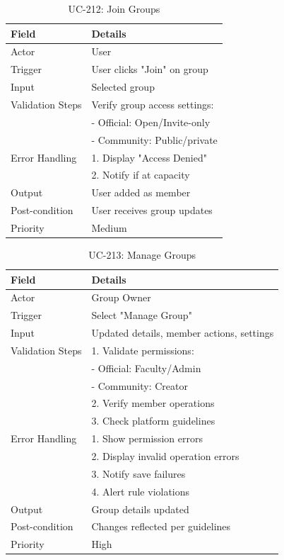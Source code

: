 \begin{table}[H]
\centering
\caption{UC-212: Join Groups}
\begin{tabular}{|l|p{10cm}|}
\hline
\textbf{Field} & \textbf{Details} \\ \hline
Actor & User \\ \hline
Trigger & User clicks "Join" on group \\ \hline
Input & Selected group \\ \hline
Validation Steps & Verify group access settings: \\ 
                 & - Official: Open/Invite-only \\ 
                 & - Community: Public/private \\ \hline
Error Handling & 1. Display "Access Denied" \\ 
               & 2. Notify if at capacity \\ \hline
Output & User added as member \\ \hline
Post-condition & User receives group updates \\ \hline
Priority & Medium \\ \hline
\end{tabular}
\end{table}

\begin{table}[H]
\centering
\caption{UC-213: Manage Groups}
\begin{tabular}{|l|p{10cm}|}
\hline
\textbf{Field} & \textbf{Details} \\ \hline
Actor & Group Owner \\ \hline
Trigger & Select "Manage Group" \\ \hline
Input & Updated details, member actions, settings \\ \hline
Validation Steps & 1. Validate permissions: \\ 
                 & - Official: Faculty/Admin \\ 
                 & - Community: Creator \\ 
                 & 2. Verify member operations \\ 
                 & 3. Check platform guidelines \\ \hline
Error Handling & 1. Show permission errors \\ 
               & 2. Display invalid operation errors \\ 
               & 3. Notify save failures \\ 
               & 4. Alert rule violations \\ \hline
Output & Group details updated \\ \hline
Post-condition & Changes reflected per guidelines \\ \hline
Priority & High \\ \hline
\end{tabular}
\end{table}


